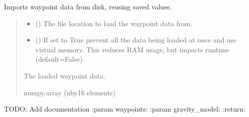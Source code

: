 \documentclass[letterpaper,10pt,english]{sphinxmanual}
\begin{document}
\begin{fulllineitems}
\label{\detokenize{modules/waypoints/generation:qnav.waypoints.generation.load_waypoints}}
\pysigstartsignatures
{}
\pysigstopsignatures
\sphinxAtStartPar
Imports waypoint data from disk, reusing saved values.
\begin{quote}\begin{description}
\begin{itemize}
\item {} 
\sphinxAtStartPar
{} () \textendash{} The file location to load the waypoint data from.

\item {} 
\sphinxAtStartPar
{} () \textendash{} If set to True prevent all the data being loaded at
once and use virtual memory. This reduces RAM usage, but impacts
runtime (default=False).

\end{itemize}

\sphinxAtStartPar
The loaded waypoint data.

\sphinxAtStartPar
numpy.array (n\sphinxhyphen{}by\sphinxhyphen{}16 elements)

\end{description}\end{quote}

\end{fulllineitems}


\begin{fulllineitems}
\label{\detokenize{modules/waypoints/generation:qnav.waypoints.generation.get_trajectory}}
\pysigstartsignatures
{}
\pysigstopsignatures
\sphinxAtStartPar
TODO: Add documentation
:param waypoints:
:param gravity\_model:
:return:

\end{fulllineitems}
\end{document}
